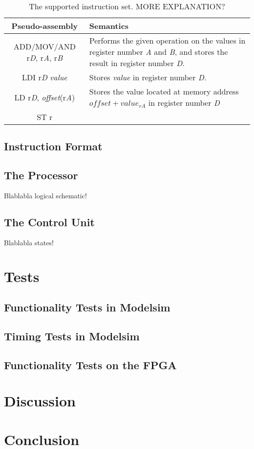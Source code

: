 \documentclass[11pt]{article}
\begin{document}
\begin{table}[htbp]
  \centering
  \begin{tabular}{|c|p{200pt}|}
    \hline
    {\bf Pseudo-assembly} & {\bf Semantics} \\ \hline
    ADD/MOV/AND r{\em D}, r{\em A}, r{\em B} &  Performs the given operation on the values in register number {\em A} and {\em B}, and stores the result in register number {\em D}. \\ \hline
    LDI r{\em D} {\em value} & Stores {\em value} in register number {\em D}. \\ \hline
    LD r{\em D}, {\em offset}(r{\em A}) & Stores the value located at memory address $offset + value_{rA}$ in register number {\em D} \\ \hline
    ST r

  \end{tabular}
  \caption{The supported instruction set. MORE EXPLANATION?}
  \label{tab:instructionSet}
\end{table}


\subsection{Instruction Format}
\label{subsec:instructionFormat}

\subsection{The Processor}
\label{subsec:processor}
Blablabla logical schematic!

\subsection{The Control Unit}
\label{subsec:controlunit}
Blablabla states!

\section{Tests}
\label{sec:tests}

\subsection{Functionality Tests in Modelsim}
\label{subsec:functestsim}

\subsection{Timing Tests in Modelsim}
\label{subsec:timingtestsim}

\subsection{Functionality Tests on the FPGA}
\label{subsec:functestfpga}



\section{Discussion}
\label{sec:discussion}

\section{Conclusion}
\label{sec:conclusion}




\end{document}

